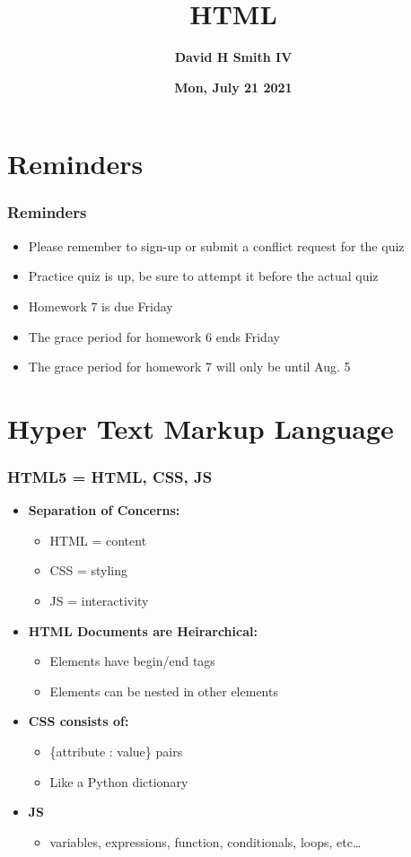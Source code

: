 \documentclass{beamer}
\title{\textbf{HTML}}
\author{\textbf{David H Smith IV}}
\institute[\textbf{UIUC}]{\textbf{University of Illinois Urbana-Champaign}}
\date{\textbf{Mon, July 21 2021}}
\begin{document}
\frame{\titlepage}

\section{Reminders}

%
%
\begin{frame}
  \frametitle{Reminders}
  \begin{itemize}
    \item Please remember to sign-up or submit a conflict request for the quiz
    \item Practice quiz is up, be sure to attempt it before the actual quiz
    \item Homework 7 is due Friday 
    \item The grace period for homework 6 ends Friday
    \item The grace period for homework 7 will only be until Aug. 5
  \end{itemize}
\end{frame}

\section{Hyper Text Markup Language}

%
%
\begin{frame}[fragile]
  \frametitle{HTML5 = HTML, CSS, JS}
  \pause
  \begin{itemize}
    \item \textbf{Separation of Concerns: }
    \begin{itemize}
      \item HTML = content
      \item CSS = styling
      \item JS = interactivity
    \end{itemize}
    \pause
    \item \textbf{HTML Documents are Heirarchical: }
    \begin{itemize}
      \item Elements have begin/end tags
      \item Elements can be nested in other elements
    \end{itemize}
    \pause
    \item \textbf{CSS consists of:}
    \begin{itemize}
      \item \{attribute : value\} pairs
      \item Like a Python dictionary
    \end{itemize}
    \pause
    \item \textbf{JS}
    \begin{itemize}
      \item variables, expressions, function, conditionals, loops, etc\ldots
    \end{itemize}
  \end{itemize}
\end{frame}
\end{document}
